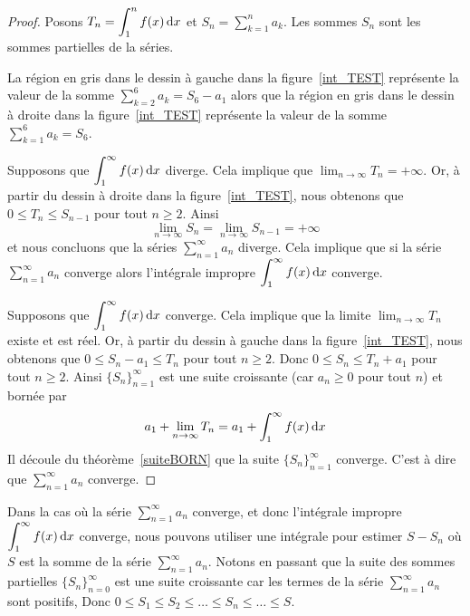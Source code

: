 {\begin{proof}
Posons $\displaystyle T_n = \int_1^n f(x)\,\mathrm{d}x$ et
$\displaystyle S_n = \sum_{k=1}^n a_k$.  Les sommes $S_n$ sont les
sommes partielles de la séries.

La région en gris dans le dessin à gauche dans la
figure~\ref{int_TEST} représente la valeur de la somme
$\displaystyle \sum_{k=2}^6 a_k = S_6 - a_1$ alors que la région en gris
dans le dessin à droite dans la figure~\ref{int_TEST} représente la
valeur de la somme $\displaystyle \sum_{k=1}^6 a_k = S_6$.

 Supposons que $\displaystyle \int_1^\infty f(x)\,\mathrm{d}x$ diverge. Cela
implique que $\displaystyle \lim_{n\rightarrow \infty} T_n = +\infty$.
Or, à partir du dessin à droite dans la figure~\ref{int_TEST}, nous
obtenons que $0 \leq T_n \leq S_{n-1}$ pour tout $n\geq 2$.  Ainsi
\[
\lim_{n\rightarrow \infty} S_n =
\lim_{n\rightarrow \infty} S_{n-1} = +\infty
\]
et nous concluons que la séries $\displaystyle \sum_{n=1}^\infty a_n$ diverge.
Cela implique que si la série $\displaystyle \sum_{n=1}^\infty a_n$
converge alors l'intégrale impropre
$\displaystyle \int_1^\infty f(x)\,\mathrm{d}x$ converge.

 Supposons que $\displaystyle \int_1^\infty f(x)\,\mathrm{d}x$ converge.
Cela implique que la limite $\displaystyle \lim_{n\rightarrow \infty} T_n$
existe et est réel.  Or, à partir du dessin à gauche dans la
figure~\ref{int_TEST}, nous obtenons que
$0 \leq S_n - a_1 \leq T_n$ pour tout $n\geq 2$.  Donc
$0 \leq S_n \leq T_n + a_1$ pour tout $n\geq 2$.  Ainsi
$\displaystyle \{S_n\}_{n=1}^\infty$ est une suite croissante (car
$a_n \geq 0$ pour tout $n$) et bornée par
\[
a_1 + \lim_{n\rightarrow \infty} T_n = a_1 + \int_1^\infty f(x)\,\mathrm{d}x
\]
Il découle du théorème~\ref{suiteBORN} que la suite
$\displaystyle \{S_n\}_{n=1}^\infty$ converge.  C'est à dire que
$\displaystyle \sum_{n=1}^\infty a_n$ converge.
\end{proof}

\begin{rmk}
Dans la cas où la série $\displaystyle \sum_{n=1}^\infty a_n$
converge, et donc l'intégrale impropre
$\displaystyle \int_1^\infty f(x)\,\mathrm{d}x$ converge, nous pouvons utiliser
une intégrale pour estimer $S - S_n$ où $S$ est la somme de la
série $\displaystyle \sum_{n=1}^\infty a_n$.
Notons en passant que la suite des sommes partielles
$\displaystyle \{S_n\}_{n=0}^\infty$ est une suite croissante car les
termes de la série $\displaystyle \sum_{n=1}^\infty a_n$ sont
positifs,  Donc
$0 \leq S_1 \leq S_2 \leq \ldots \leq S_n \leq \ldots \leq S$.


\end{rmk}}
